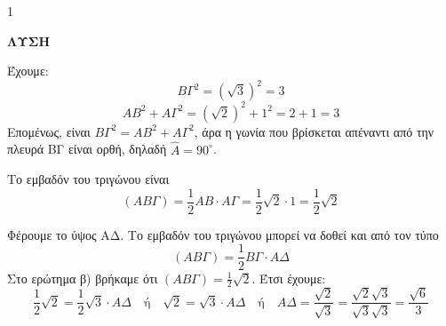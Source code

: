 \begin{ylh}{1}
    \item [Τρίγωνα, Πυθαγόρειο Θεώρημα, Εμβαδόν Τριγώνου]
\end{ylh}
\begin{figure} %
    \centering
\end{figure}

\noindent \textsf{\bfseries ΛΥΣΗ}

\begin{alist}
    \item Έχουμε:
    \[ ΒΓ^2 = (\sqrt{3})^2 = 3 \]
    \[ ΑΒ^2 + ΑΓ^2 = (\sqrt{2})^2 + 1^2 = 2 + 1 = 3 \]
    Επομένως, είναι $ΒΓ^2 = ΑΒ^2 + ΑΓ^2$, άρα η γωνία που βρίσκεται απέναντι από την πλευρά ΒΓ είναι ορθή, δηλαδή $\hat{Α} = 90^\circ$.
    
    \item Το εμβαδόν του τριγώνου είναι
    \[ (ΑΒΓ) = \frac{1}{2}ΑΒ \cdot ΑΓ = \frac{1}{2}\sqrt{2} \cdot 1 = \frac{1}{2}\sqrt{2} \]
    
    \item Φέρουμε το ύψος ΑΔ. Το εμβαδόν του τριγώνου μπορεί να δοθεί και από τον τύπο
    \[ (ΑΒΓ) = \frac{1}{2} ΒΓ \cdot ΑΔ \]
    Στο ερώτημα β) βρήκαμε ότι $(ΑΒΓ) = \frac{1}{2}\sqrt{2}$.
    Έτσι έχουμε:
    \[ \frac{1}{2}\sqrt{2} = \frac{1}{2}\sqrt{3} \cdot ΑΔ \quad \text{ή} \quad \sqrt{2} = \sqrt{3} \cdot ΑΔ \quad \text{ή} \quad ΑΔ = \frac{\sqrt{2}}{\sqrt{3}} = \frac{\sqrt{2}\sqrt{3}}{\sqrt{3}\sqrt{3}} = \frac{\sqrt{6}}{3} \]
\end{alist}